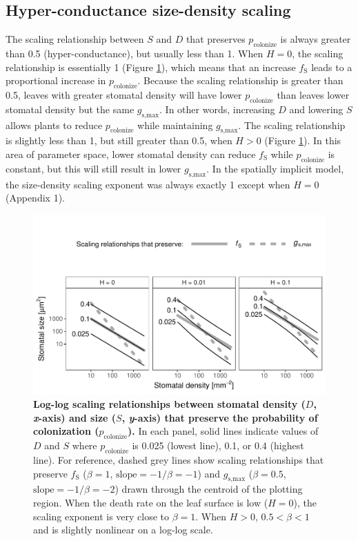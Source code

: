 \documentclass[utf8]{frontiersSCNS}
\newcommand{\fs}{$f_\text{S}$}
\newcommand{\gsmax}{$g_\text{s,max}$}
\begin{document}
\hypertarget{hyper-conductance-size-density-scaling}{%
\subsection*{Hyper-conductance size-density
scaling}\label{hyper-conductance-size-density-scaling}}

The scaling relationship between \(S\) and \(D\) that preserves
\(p_\text{colonize}\) is always greater than 0.5 (hyper-conductance),
but usually less than 1. When \(H = 0\), the scaling relationship is
essentially 1 (Figure \ref{fig:fig4}), which means that an increase
\fs{} leads to a proportional increase in \(p_\text{colonize}\). Because
the scaling relationship is greater than 0.5, leaves with greater
stomatal density will have lower \(p_\text{colonize}\) than leaves lower
stomatal density but the same \gsmax. In other words, increasing \(D\)
and lowering \(S\) allows plants to reduce \(p_\text{colonize}\) while
maintaining \gsmax. The scaling relationship is slightly less than 1,
but still greater than 0.5, when \(H > 0\) (Figure \ref{fig:fig4}). In
this area of parameter space, lower stomatal density can reduce \fs{}
while \(p_\text{colonize}\) is constant, but this will still result in
lower \gsmax. In the spatially implicit model, the size-density scaling
exponent was always exactly 1 except when \(H = 0\) (Appendix 1).

\begin{figure}
  \centering
    \includegraphics{../figures/fig4.pdf}
    \caption{\textbf{Log-log scaling relationships between stomatal density ($D$, \textit{x}-axis) and size ($S$, \textit{y}-axis) that preserve the probability of colonization ($p_\text{colonize}$).} In each panel, solid lines indicate values of $D$ and $S$ where $p_\text{colonize}$ is 0.025 (lowest line), 0.1, or 0.4 (highest line). For reference, dashed grey lines show scaling relationships that preserve \fs{} ($\beta = 1$, $\text{slope} = - 1 / \beta = -1$) and \gsmax{} ($\beta = 0.5$, $\text{slope} = - 1 / \beta = -2$) drawn through the centroid of the plotting region. When the death rate on the leaf surface is low ($H = 0$), the scaling exponent is very close to $\beta = 1$. When $H > 0$, $0.5 < \beta < 1$ and is slightly nonlinear on a log-log scale.}
    \label{fig:fig4}
\end{figure}
\end{document}
